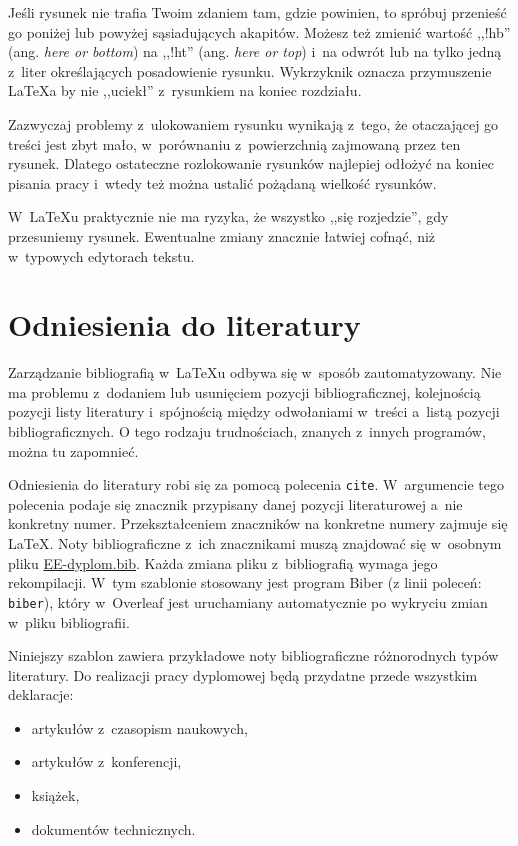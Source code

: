 Jeśli rysunek nie trafia Twoim zdaniem tam, gdzie powinien, to spróbuj przenieść go poniżej lub powyżej sąsiadujących akapitów. Możesz też zmienić wartość ,,!hb'' (ang. \textit{here or bottom}) na ,,!ht'' (ang. \textit{here or top}) i~na odwrót lub na tylko jedną z~liter określających posadowienie rysunku. Wykrzyknik oznacza przymuszenie \LaTeX{a} by nie ,,uciekł'' z~rysunkiem na koniec rozdziału.

Zazwyczaj problemy z~ulokowaniem rysunku wynikają z~tego, że otaczającej go treści jest zbyt mało, w~porównaniu z~powierzchnią zajmowaną przez ten rysunek. Dlatego ostateczne rozlokowanie rysunków najlepiej odłożyć na koniec pisania pracy i~wtedy też można ustalić pożądaną wielkość rysunków.

W~\LaTeX{u} praktycznie nie ma ryzyka, że wszystko ,,się rozjedzie'', gdy przesuniemy rysunek. Ewentualne zmiany znacznie łatwiej cofnąć, niż w~typowych edytorach tekstu.

\section{Odniesienia do literatury}
Zarządzanie bibliografią w~\LaTeX{u} odbywa się w~sposób zautomatyzowany. Nie ma problemu z~dodaniem lub usunięciem pozycji bibliograficznej, kolejnością pozycji listy literatury i~spójnością między odwołaniami w~treści a~listą pozycji bibliograficznych. O tego rodzaju trudnościach, znanych z~innych programów, można tu zapomnieć.

Odniesienia do literatury robi się za pomocą polecenia \texttt{cite}. W~argumencie tego polecenia podaje się znacznik przypisany danej pozycji literaturowej a~nie konkretny numer. Przekształceniem znaczników na konkretne numery zajmuje się \LaTeX{}. Noty bibliograficzne z~ich znacznikami muszą znajdować się w~osobnym pliku \href{./EE-dyplom.bib}{EE-dyplom.bib}. Każda zmiana pliku z~bibliografią wymaga jego rekompilacji. W~tym szablonie stosowany jest program Biber (z linii poleceń: \texttt{biber}), który w~Overleaf jest uruchamiany automatycznie po wykryciu zmian w~pliku bibliografii.

Niniejszy szablon zawiera przykładowe noty bibliograficzne różnorodnych typów literatury. Do realizacji pracy dyplomowej będą przydatne przede wszystkim deklaracje:
\begin{itemize}
    \item artykułów z~czasopism naukowych,
    \item artykułów z~konferencji,
    \item książek,
    \item dokumentów technicznych.
\end{itemize}

